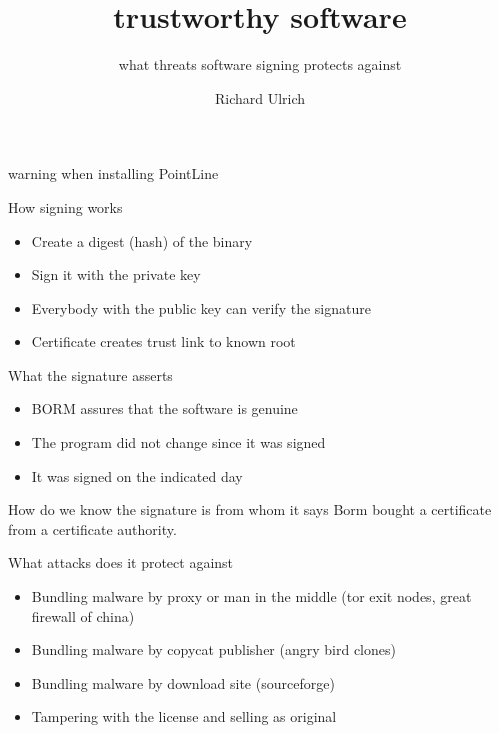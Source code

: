 \documentclass[11pt]{beamer}
\author{Richard Ulrich}
\title{trustworthy software}
\subtitle{what threats software signing protects against}
\institute{BORM Informatik AG}
\begin{document}
\begin{frame}
\titlepage
\end{frame}


\begin{frame}{warning when installing PointLine}

\end{frame}

\begin{frame}{How signing works}
\begin{itemize}
\item Create a digest (hash) of the binary
\item Sign it with the private key
\item Everybody with the public key can verify the signature
\item Certificate creates trust link to known root
\end{itemize}
\end{frame}

\begin{frame}{What the signature asserts}
\begin{itemize}
\item BORM assures that the software is genuine
\item The program did not change since it was signed
\item It was signed on the indicated day
\end{itemize}
\end{frame}

\begin{frame}{How do we know the signature is from whom it says}
Borm bought a certificate from a certificate authority.
\end{frame}

\begin{frame}{What attacks does it protect against}
\begin{itemize}
\item Bundling malware by proxy or man in the middle (tor exit nodes, great firewall of china)
\item Bundling malware by copycat publisher (angry bird clones)
\item Bundling malware by download site (sourceforge)
\item Tampering with the license and selling as original
\end{itemize}
\end{frame}
\end{document}
